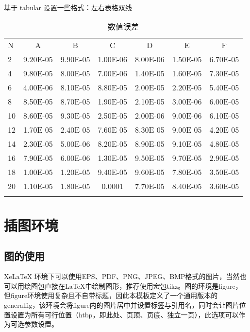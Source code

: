 \documentclass{shnuthesis}
\begin{document}
基于 tabular 设置一些格式：左右表格双线

\begin{table}[htp!]
\centering
\renewcommand\arraystretch{1.2} %
\caption{数值误差}
\label{table2}
\begin{tabularx}{0.9\textwidth}{||P{1cm}|C|C|C|C|C|C||}
\Xhline{2\arrayrulewidth}
N  & A       & B    & C       & D      & E       & F   \\
\Xhline{2\arrayrulewidth}
2  & 9.20E-05 & 9.90E-05 & 1.00E-06 & 8.00E-06 & 1.50E-05 & 6.70E-05 \\
4  & 9.80E-05 & 8.00E-05 & 7.00E-06 & 1.40E-05 & 1.60E-05 & 7.30E-05 \\
6  & 4.00E-06 & 8.10E-05 & 8.80E-05 & 2.00E-05 & 2.20E-05 & 5.40E-05 \\
8  & 8.50E-05 & 8.70E-05 & 1.90E-05 & 2.10E-05 & 3.00E-06 & 6.00E-05 \\
10 & 8.60E-05 & 9.30E-05 & 2.50E-05 & 2.00E-06 & 9.00E-06 & 6.10E-05 \\
12 & 1.70E-05 & 2.40E-05 & 7.60E-05 & 8.30E-05 & 9.00E-05 & 4.20E-05 \\
14 & 2.30E-05 & 5.00E-06 & 8.20E-05 & 8.90E-05 & 9.10E-05 & 4.80E-05 \\
16 & 7.90E-05 & 6.00E-06 & 1.30E-05 & 9.50E-05 & 9.70E-05 & 2.90E-05 \\
18 & 1.00E-05 & 1.20E-05 & 9.40E-05 & 9.60E-05 & 7.80E-05 & 3.50E-05 \\
20 & 1.10E-05 & 1.80E-05 & 0.0001   & 7.70E-05 & 8.40E-05 & 3.60E-05  \\
\Xhline{2\arrayrulewidth}
\end{tabularx}
\end{table}

	


\chapter{插图环境}

\section{图的使用}
	XeLaTeX 环境下可以使用EPS、PDF、PNG、JPEG、BMP格式的图片，当然也可以用绘图包直接在\LaTeX 中绘制图形，推荐使用宏包tikz。图的环境是figure，但figure环境使用复杂且不自带标题，因此本模板定义了一个通用版本的generalfig，该环境会将figure内的图片居中并设置标签与引用名，同时会让图片位置设置为所有可行位置（htbp，即此处、页顶、页底、独立一页），此选项可以作为可选参数设置。
\end{document}
